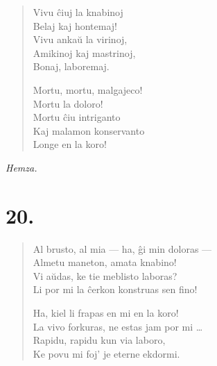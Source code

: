 \documentclass[ngerman,12pt,twoside]{book}
\begin{document}
\begin{verse}
\pstars

\begin{patverse} \vin \vin
Vivu ĉiuj la knabinoj\\
Belaj kaj hontemaj!\\
Vivu ankaŭ la virinoj,\\
Amikinoj kaj mastrinoj,\\
Bonaj, laboremaj.
\end{patverse}

\pstars

\begin{patverse} \vin \vin
Mortu, mortu, malgajeco!\\
Mortu la doloro!\\
Mortu ĉiu intriganto\\
Kaj malamon konservanto\\
Longe en la koro!
\end{patverse}

\end{verse}

\begin{flushright}
\it Hemza. 
\end{flushright}

\begin{center}
\end{center}

\section*{20.}

{\centering{}\par}

\begin{verse}
Al brusto, al mia --- ha, ĝi min doloras --- \\
  \vin   Almetu maneton, amata knabino!\\
Vi aŭdas, ke tie meblisto laboras?\\
  \vin   Li por mi la ĉerkon konstruas sen fino!

\pstars

Ha, kiel li frapas en mi en la koro!\\
\vin     La vivo forkuras, ne estas jam por mi \ldots{}\\
Rapidu, rapidu kun via laboro,\\
  \vin   Ke povu mi foj' je eterne ekdormi.
\end{verse}
\end{document}
